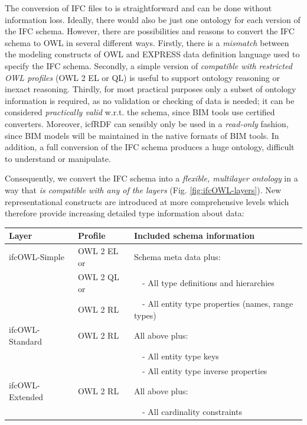 The conversion of IFC files to \ifcrdf{} is straightforward and can be done 
without information loss.
Ideally, there would also be just one \ifcowl{} ontology for each version of the IFC schema. However,
there are possibilities and reasons to convert the IFC schema to OWL in several different ways. Firstly, there is a \emph{mismatch} between the modeling constructs of OWL and 
EXPRESS data definition language \cite{schenck1994information} used to specify the IFC schema. Secondly, a simple version of \ifcowl{} \emph{compatible with
restricted OWL profiles} (OWL 2 EL or QL) \cite{motik2012owl} is useful to support ontology
reasoning or inexact reasoning. Thirdly, for most practical purposes only a subset of ontology
information is required, as no validation or checking of \ifcrdf{} data is needed; it can
be considered \emph{practically valid} w.r.t. the schema, since BIM tools use certified converters. Moreover, icfRDF can sensibly only be used in a
\emph{read-only} fashion, since BIM models will be maintained in the native formats of BIM
tools. In addition, a full conversion of the IFC schema produces a huge ontology, difficult to understand or manipulate.

Consequently, we convert the IFC schema into a \emph{flexible, multilayer \ifcowl{} ontology}
in a way that \emph{\ifcrdf{} is compatible with any of the layers} (Fig. \ref{fig:ifcOWL-layers}). 
New representational constructs are introduced at more comprehensive levels which therefore 
provide increasing detailed type information about \ifcrdf{} data: 

\vspace{0.5\topsep}
\noindent
\begin{scriptsize}
\begin{center}
    \def\arraystretch{1.2}
    \setlength{\tabcolsep}{6pt}
    \begin{tabularx}{0.95\textwidth}{|l|l|X|}
        \hline
            \textbf{Layer} & \textbf{Profile} & \textbf{Included schema information} \\
        \hline
            ifcOWL-Simple & OWL 2 EL or & Schema meta data plus: \\
            & OWL 2 QL or & \ \ - All type definitions and hierarchies \\
            & OWL 2 RL & \ \ - All entity type properties (names, range types) \\
        \hline 
            ifcOWL-Standard & OWL 2 RL & All above plus: \\
            & & \ \ - All entity type keys \\
            & & \ \ - All entity type inverse properties \\
        \hline
            ifcOWL-Extended & OWL 2 RL & All above plus: \\
            & & \ \ - All cardinality constraints \\
        \hline
    \end{tabularx}
\end{center}
\end{scriptsize}

